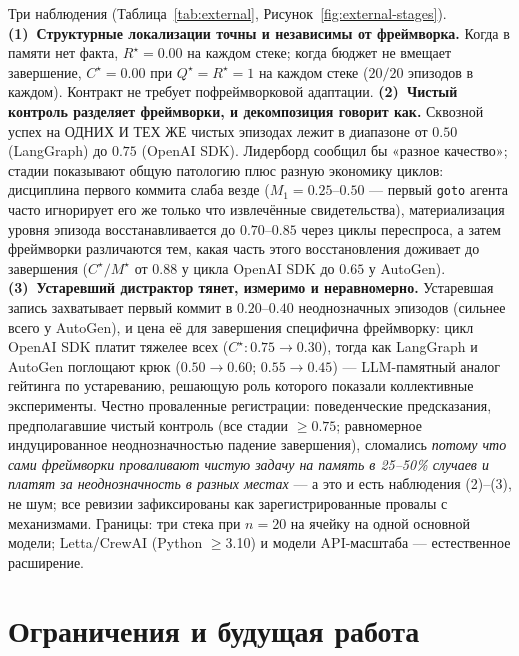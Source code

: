 \documentclass{article}
\newcommand{\method}[1]{\texttt{#1}}
\begin{document}
Три наблюдения (Таблица~\ref{tab:external},
Рисунок~\ref{fig:external-stages}). \textbf{(1)~Структурные
локализации точны и независимы от фреймворка.} Когда в памяти
нет факта, $R^\star{=}0.00$ на каждом стеке; когда бюджет
не вмещает завершение, $C^\star{=}0.00$ при $Q^\star{=}R^\star{=}1$ на
каждом стеке ($20/20$ эпизодов в каждом). Контракт не требует
пофреймворковой адаптации. \textbf{(2)~Чистый контроль разделяет
фреймворки, и декомпозиция говорит как.} Сквозной успех на
ОДНИХ И ТЕХ ЖЕ чистых эпизодах лежит в диапазоне от $0.50$ (LangGraph) до $0.75$ (OpenAI SDK).
Лидерборд сообщил бы «разное качество»; стадии показывают
общую патологию плюс разную экономику циклов: дисциплина первого
коммита слаба везде ($M_1{=}0.25$--$0.50$ --- первый
\method{goto} агента часто игнорирует его же только что извлечённые
свидетельства), материализация уровня эпизода восстанавливается до $0.70$--$0.85$
через циклы переспроса, а затем фреймворки различаются тем, какая часть
этого восстановления доживает до завершения ($C^\star/M^\star$ от $0.88$
у цикла OpenAI SDK до $0.65$ у AutoGen). \textbf{(3)~Устаревший
дистрактор тянет, измеримо и неравномерно.} Устаревшая запись
захватывает первый коммит в $0.20$--$0.40$ неоднозначных эпизодов
(сильнее всего у AutoGen), и цена её для завершения
специфична фреймворку: цикл OpenAI SDK платит тяжелее всех
($C^\star:0.75\to0.30$), тогда как LangGraph и AutoGen поглощают крюк
($0.50\to0.60$; $0.55\to0.45$) --- LLM-памятный аналог
гейтинга по устареванию, решающую роль которого показали коллективные
эксперименты. Честно проваленные регистрации: поведенческие предсказания,
предполагавшие чистый контроль (все стадии $\ge 0.75$; равномерное
индуцированное неоднозначностью падение завершения), сломались \emph{потому что сами фреймворки
проваливают чистую задачу на память в 25--50\% случаев и платят за
неоднозначность в разных местах} --- а это и есть наблюдения (2)--(3), не
шум; все ревизии зафиксированы как зарегистрированные провалы с
механизмами. Границы: три стека при $n{=}20$ на ячейку на одной основной
модели; Letta/CrewAI (Python $\ge$3.10) и модели API-масштаба --- естественное
расширение.

\section{Ограничения и будущая работа}
\label{sec:limitations}
\end{document}
